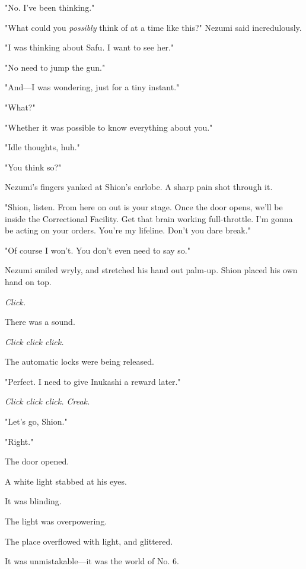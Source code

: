 "No. I've been thinking."

"What could you \emph{possibly} think of at a time like this?" Nezumi said
incredulously.

"I was thinking about Safu. I want to see her."

"No need to jump the gun."

"And---I was wondering, just for a tiny instant."

"What?"

"Whether it was possible to know everything about you."

"Idle thoughts, huh."

"You think so?"

Nezumi's fingers yanked at Shion's earlobe. A sharp pain shot through
it.

"Shion, listen. From here on out is your stage. Once the door opens,
we'll be inside the Correctional Facility. Get that brain working
full-throttle. I'm gonna be acting on your orders. You're my lifeline.
Don't you dare break."

"Of course I won't. You don't even need to say so."

Nezumi smiled wryly, and stretched his hand out palm-up. Shion placed
his own hand on top.

\emph{Click.}

There was a sound.

\emph{Click click click.}

The automatic locks were being released.

"Perfect. I need to give Inukashi a reward later."

\emph{Click click click. Creak.}

"Let's go, Shion."

"Right."

The door opened.

A white light stabbed at his eyes.

It was blinding.

The light was overpowering.

The place overflowed with light, and glittered.

It was unmistakable---it was the world of No. 6.
